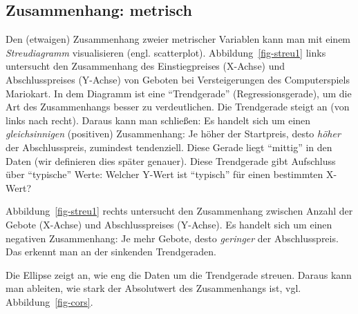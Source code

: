 \documentclass[
  a4paper,
  DIV=11]{scrreprt}
\theoremstyle{definition}
\theoremstyle{definition}
\theoremstyle{definition}
\theoremstyle{remark}
\begin{document}
\subsection{Zusammenhang: metrisch}\label{sec-zshg-metr}

Den (etwaigen) Zusammenhang zweier metrischer Variablen kann man mit
einem \emph{Streudiagramm} visualisieren (engl. scatterplot).
Abbildung~\ref{fig-streu1} links untersucht den Zusammenhang des
Einstiegpreises (X-Achse) und Abschlusspreises (Y-Achse) von Geboten bei
Versteigerungen des Computerspiels Mariokart. In dem Diagramm ist eine
``Trendgerade'' (Regressionsgerade), um die Art des Zusammenhangs besser
zu verdeutlichen. Die Trendgerade steigt an (von links nach recht).
Daraus kann man schließen: Es handelt sich um einen
\emph{gleichsinnigen} (positiven) Zusammenhang: Je höher der Startpreis,
desto \emph{höher} der Abschlusspreis, zumindest tendenziell. Diese
Gerade liegt ``mittig'' in den Daten (wir definieren dies später
genauer). Diese Trendgerade gibt Aufschluss über ``typische'' Werte:
Welcher Y-Wert ist ``typisch'' für einen bestimmten X-Wert?

Abbildung~\ref{fig-streu1} rechts untersucht den Zusammenhang zwischen
Anzahl der Gebote (X-Achse) und Abschlusspreises (Y-Achse). Es handelt
sich um einen negativen Zusammenhang: Je mehr Gebote, desto
\emph{geringer} der Abschlusspreis. Das erkennt man an der sinkenden
Trendgeraden.

Die Ellipse zeigt an, wie eng die Daten um die Trendgerade streuen.
Daraus kann man ableiten, wie stark der Absolutwert des Zusammenhangs
ist, vgl. Abbildung~\ref{fig-cors}.
\end{document}
